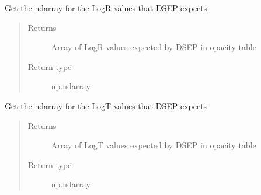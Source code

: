 \documentclass[letterpaper,10pt,english]{sphinxmanual}
\begin{document}
\begin{fulllineitems}
\label{\detokenize{pyTOPSScrape.misc:pyTOPSScrape.misc.utils.get_target_log_R}}
\sphinxAtStartPar
Get the ndarray for the LogR values that DSEP expects
\begin{quote}\begin{description}
\item[{Returns}] \leavevmode
\sphinxAtStartPar
{} \textendash{} Array of LogR values expected by DSEP in opacity table

\item[{Return type}] \leavevmode
\sphinxAtStartPar
np.ndarray

\end{description}\end{quote}

\end{fulllineitems}


\begin{fulllineitems}
\label{\detokenize{pyTOPSScrape.misc:pyTOPSScrape.misc.utils.get_target_log_T}}
\sphinxAtStartPar
Get the ndarray for the LogT values that DSEP expects
\begin{quote}\begin{description}
\item[{Returns}] \leavevmode
\sphinxAtStartPar
{} \textendash{} Array of LogT values expected by DSEP in opacity table

\item[{Return type}] \leavevmode
\sphinxAtStartPar
np.ndarray

\end{description}\end{quote}

\end{fulllineitems}

\end{document}

